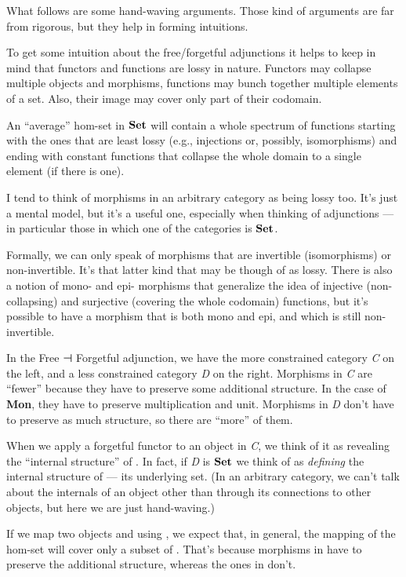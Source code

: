 What follows are some hand-waving arguments. Those kind of arguments are
far from rigorous, but they help in forming intuitions.

To get some intuition about the free/forgetful adjunctions it helps to
keep in mind that functors and functions are lossy in nature. Functors
may collapse multiple objects and morphisms, functions may bunch
together multiple elements of a set. Also, their image may cover only
part of their codomain.

An ``average'' hom-set in $\mathbf{Set}$ will contain a whole spectrum of
functions starting with the ones that are least lossy (e.g., injections
or, possibly, isomorphisms) and ending with constant functions that
collapse the whole domain to a single element (if there is one).

I tend to think of morphisms in an arbitrary category as being lossy
too. It's just a mental model, but it's a useful one, especially when
thinking of adjunctions --- in particular those in which one of the
categories is $\mathbf{Set}$.

Formally, we can only speak of morphisms that are invertible
(isomorphisms) or non-invertible. It's that latter kind that may be
though of as lossy. There is also a notion of mono- and epi- morphisms
that generalize the idea of injective (non-collapsing) and surjective
(covering the whole codomain) functions, but it's possible to have a
morphism that is both mono and epi, and which is still non-invertible.

In the Free ⊣ Forgetful adjunction, we have the more constrained
category \emph{C} on the left, and a less constrained category \emph{D}
on the right. Morphisms in \emph{C} are ``fewer'' because they have to
preserve some additional structure. In the case of \textbf{Mon}, they
have to preserve multiplication and unit. Morphisms in \emph{D} don't
have to preserve as much structure, so there are ``more'' of them.

When we apply a forgetful functor  to an object  in
\emph{C}, we think of it as revealing the ``internal structure'' of
. In fact, if \emph{D} is $\mathbf{Set}$ we think of 
as \emph{defining} the internal structure of  --- its
underlying set. (In an arbitrary category, we can't talk about the
internals of an object other than through its connections to other
objects, but here we are just hand-waving.)

If we map two objects  and  using ,
we expect that, in general, the mapping of the hom-set
 will cover only a subset of
. That's because morphisms in
 have to preserve the additional structure,
whereas the ones in  don't.

